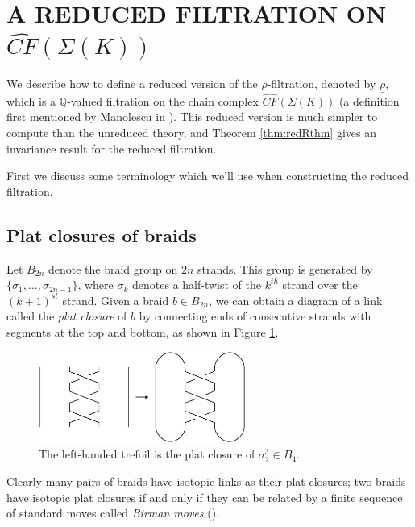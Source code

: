 \documentclass[11pt]{article}
\theoremstyle{plain} \newtheorem{thm}{Theorem}[subsection]
\theoremstyle{plain} \newtheorem{cor}[thm]{Corollary}
\theoremstyle{plain} \newtheorem{prop}[thm]{Proposition}
\theoremstyle{plain} \newtheorem{conj}[thm]{Conjecture}
\theoremstyle{plain} \newtheorem{lem}[thm]{Lemma}
\theoremstyle{definition} \newtheorem{df}[thm]{Definition}
\theoremstyle{remark} \newtheorem{rmk}[thm]{Remark}
\theoremstyle{remark} \newtheorem{obs}[thm]{Observation}
\newcommand{\Bn}{B_{2n}}
\newcommand{\B}[1]{B_{#1} }
\newcommand{\DBC}[1]{\Sigma(#1)}
\newcommand{\red}[1]{\underline{#1}}
\numberwithin{equation}{section}
\begin{document}
\section{A REDUCED FILTRATION ON $\widehat{CF}(\DBC{K})$}\label{sec:redR}

We describe how to define a reduced version of the $\rho$-filtration, denoted by $\red{\rho}$, which is a $\mathbb{Q}$-valued filtration on the chain complex $\widehat{CF}(\DBC{K})$ (a definition first mentioned by Manolescu in \cite{cm:R}).  This reduced version is much simpler to compute than the unreduced theory, and Theorem \ref{thm:redRthm} gives an invariance result for the reduced filtration.

First we discuss some terminology which we'll use when constructing the reduced filtration.

\subsection{Plat closures of braids}\label{sec:plat}

Let $\Bn$ denote the braid group on $2n$ strands.  This group is generated by $\{ \sigma_{1} , \ldots, \sigma_{2n-1}\}$, where $\sigma_{k}$ denotes a half-twist of the $k^{th}$ strand over the $(k+1)^{st}$ strand.  Given a braid $b \in \Bn$, we can obtain a diagram of a link called the \textit{plat closure} of $b$ by connecting ends of consecutive strands with segments at the top and bottom, as shown in Figure \ref{fig:explat}.

\begin{figure}[h!]
\centering
\centering\includegraphics[height = 30mm]{ExPlat}
\caption{The left-handed trefoil is the plat closure of $\sigma_2^3 \in \B{4}.$}\label{fig:explat}
\end{figure}

Clearly many pairs of braids have isotopic links as their plat closures; two braids have isotopic plat closures if and only if they can be related by a finite sequence of standard moves called \textit{Birman moves} (\cite{bir:moves}).
\end{document}
